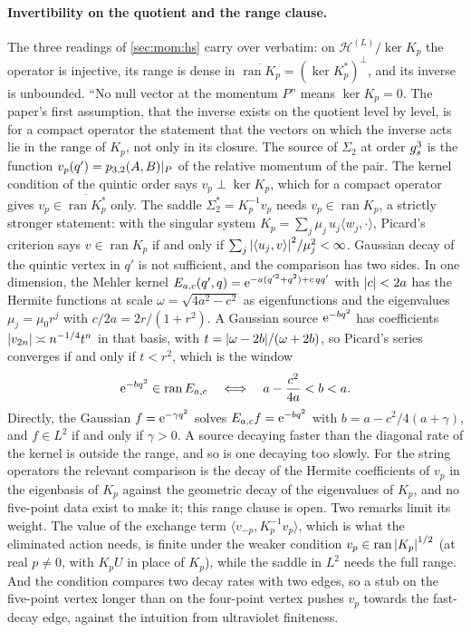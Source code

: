 \paragraph{Invertibility on the quotient and the range clause.}
The three readings of \cref{sec:mom:hs} carry over verbatim: on $\mathcal H^{(L)} / \ker K_p$ the operator is injective, its range is dense in $\overline{\operatorname{ran} K_p} = (\ker K_p^*)^\perp$, and its inverse is unbounded.
``No null vector at the momentum $P$'' means $\ker K_p = 0$.
The paper's first assumption, that the inverse exists on the quotient level by level, is for a compact operator the statement that the vectors on which the inverse acts lie in the range of $K_p$, not only in its closure.
The source of $\Sigma_2$ at order $g_s^3$ is the function $v_p(q') = p_{3,2}(A, B)|_P$ of the relative momentum of the pair.
The kernel condition of the quintic order says $v_p \perp \ker K_p$, which for a compact operator gives $v_p \in \overline{\operatorname{ran} K_p^*}$ only.
The saddle $\Sigma_2^* = K_p^{-1} v_p$ needs $v_p \in \operatorname{ran} K_p$, a strictly stronger statement: with the singular system $K_p = \sum_j \mu_j \, u_j \langle w_j, \cdot \rangle$, Picard's criterion says $v \in \operatorname{ran} K_p$ if and only if $\sum_j {|\langle u_j, v \rangle|}^2 / \mu_j^2 < \infty$.
Gaussian decay of the quintic vertex in $q'$ is not sufficient, and the comparison has two sides.
In one dimension, the Mehler kernel $E_{a, c}(q', q) = \mathrm{e}^{- a (q'^2 + q^2) + c \, q q'}$ with ${|c|} < 2 a$ has the Hermite functions at scale $\omega = \sqrt{4 a^2 - c^2}$ as eigenfunctions and the eigenvalues $\mu_j = \mu_0 r^j$ with $c / 2 a = 2 r / (1 + r^2)$.
A Gaussian source $\mathrm{e}^{- b q^2}$ has coefficients ${|v_{2 n}|} \asymp n^{-1/4} t^n$ in that basis, with $t = {|\omega - 2 b|} / (\omega + 2 b)$, so Picard's series converges if and only if $t < r^2$, which is the window
\begin{equation}
  \label{eq:mom:mehler-window}
  \mathrm{e}^{- b q^2} \in \operatorname{ran} E_{a, c}
  \quad \Longleftrightarrow \quad
  a - \frac{c^2}{4 a}
    < b
    < a.
\end{equation}
Directly, the Gaussian $f = \mathrm{e}^{- \gamma q^2}$ solves $E_{a, c} f = \mathrm{e}^{- b q^2}$ with $b = a - c^2 / 4 (a + \gamma)$, and $f \in L^2$ if and only if $\gamma > 0$.
A source decaying faster than the diagonal rate of the kernel is outside the range, and so is one decaying too slowly.
For the string operators the relevant comparison is the decay of the Hermite coefficients of $v_p$ in the eigenbasis of $K_p$ against the geometric decay of the eigenvalues of $K_p$, and no five-point data exist to make it; this range clause is open.
Two remarks limit its weight.
The value of the exchange term $\langle v_{-p}, K_p^{-1} v_p \rangle$, which is what the eliminated action needs, is finite under the weaker condition $v_p \in \operatorname{ran} {|K_p|}^{1/2}$ (at real $p \ne 0$, with $K_p U$ in place of $K_p$), while the saddle in $L^2$ needs the full range.
And the condition compares two decay rates with two edges, so a stub on the five-point vertex longer than on the four-point vertex pushes $v_p$ towards the fast-decay edge, against the intuition from ultraviolet finiteness.

